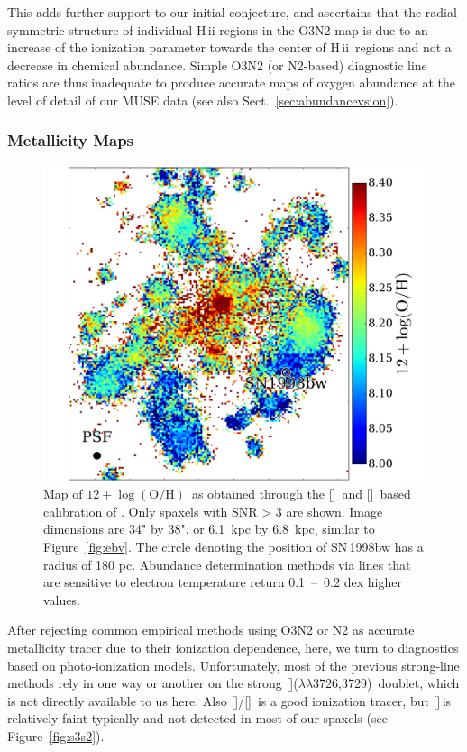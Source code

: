 \documentclass[traditabstract]{aa}
\newcommand{\hii}{\mbox{H\,{\sc ii}}}
\newcommand{\oh}{$12+\log(\mathrm{O/H})$}
\newcommand{\sii}{[\ion{S}{ii}]}
\newcommand{\siii}{[\ion{S}{iii}]}
\newcommand{\oii}{[\ion{O}{ii}]}
\newcommand{\nii}{[\ion{N}{ii}]}
\begin{document}
This adds further support to our initial conjecture, and ascertains that the radial symmetric structure of individual \hii-regions in the O3N2 map is due to an increase of the ionization parameter towards the center of \hii~regions and not a decrease in chemical abundance. Simple O3N2 (or N2-based) diagnostic line ratios are thus inadequate to produce accurate maps of oxygen abundance at the level of detail of our MUSE data (see also Sect.~\ref{sec:abundancevsion}).

\subsubsection{Metallicity Maps}
\label{sec:mapoh}

\begin{figure}
\includegraphics[angle=0, width=0.99\columnwidth]{Figs/MUSE_SN1998bw_OH.pdf}
\caption{Map of \oh\, as obtained through the \sii\, and \nii\, based calibration of \citet{2016Ap&SS.361...61D}. Only spaxels with SNR > 3 are shown. Image dimensions are 34" by 38", or 6.1~kpc by 6.8~kpc, similar to Figure~\ref{fig:ebv}. The circle denoting the position of SN\,1998bw has a radius of 180 pc. Abundance determination methods via lines that are sensitive to electron temperature return 0.1~--~0.2 dex higher values.}
\label{fig:s2}
\end{figure}

After rejecting common empirical methods using O3N2 or N2 as accurate metallicity tracer due to their ionization dependence, here, we turn to diagnostics based on photo-ionization models. Unfortunately, most of the previous strong-line methods rely in one way or another on the strong \oii($\lambda\lambda$3726,3729)\, doublet\citep{2002ApJS..142...35K}, which is not directly available to us here. Also \siii/\sii\, is a good ionization tracer, but \siii\,is relatively faint typically and not detected in most of our spaxels (see Figure~\ref{fig:s3s2}). 
\end{document}
